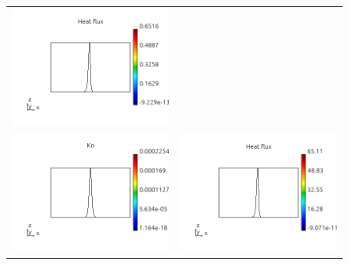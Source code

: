 \documentclass[review]{elsarticle}
\begin{document}
\begin{figure}[tbh]
\begin{center}
\begin{tabular}{cc}
      \includegraphics[width=\psize\textwidth]{figs/hflux_p71D1e12.png} \\
      \includegraphics[width=\psize\textwidth]{figs/Kn_p71D1e10.png} &
      \includegraphics[width=\psize\textwidth]{figs/hflux_p71D1e10.png} \\

\end{tabular}
\end{center}
\end{figure}
\end{document}
